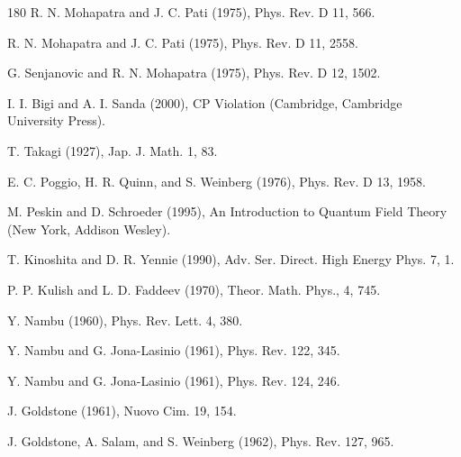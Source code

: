 \begin{thebibliography}{180}
 R. N. Mohapatra and J. C. Pati (1975), Phys. Rev. D 11, 566.

 R. N. Mohapatra and J. C. Pati (1975), Phys. Rev. D 11, 2558.

 G. Senjanovic and R. N. Mohapatra (1975), Phys. Rev. D 12, 1502.

 I. I. Bigi and A. I. Sanda (2000), CP Violation (Cambridge, Cambridge University Press).

 T. Takagi (1927), Jap. J. Math. 1, 83.

 E. C. Poggio, H. R. Quinn, and S. Weinberg (1976), Phys. Rev. D 13, 1958.

 M. Peskin and D. Schroeder (1995), An Introduction to Quantum Field Theory (New York, Addison Wesley).

 T. Kinoshita and D. R. Yennie (1990), Adv. Ser. Direct. High Energy Phys. 7, 1.

 P. P. Kulish and L. D. Faddeev (1970), Theor. Math. Phys., 4, 745.

 Y. Nambu (1960), Phys. Rev. Lett. 4, 380.

 Y. Nambu and G. Jona-Lasinio (1961), Phys. Rev. 122, 345.

 Y. Nambu and G. Jona-Lasinio (1961), Phys. Rev. 124, 246.

 J. Goldstone (1961), Nuovo Cim. 19, 154.

 J. Goldstone, A. Salam, and S. Weinberg (1962), Phys. Rev. 127, 965.


\end{thebibliography}
